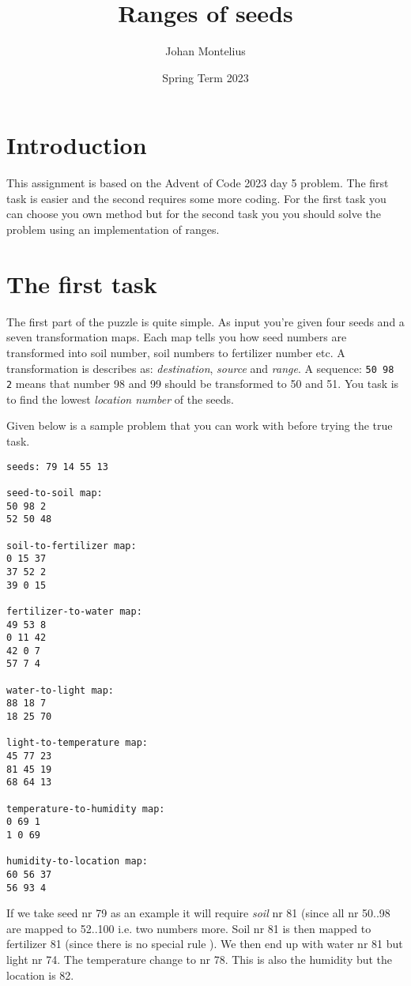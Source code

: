 \documentclass[a4paper,11pt]{article}
\begin{document}
\title{Ranges of seeds}

\author{Johan Montelius}
\date{Spring Term 2023}

\maketitle


\section*{Introduction}

This assignment is based on the Advent of Code 2023 day 5 problem. The
first task is easier and the second requires some more coding. For the
first task you can choose you own method but for the second task you
 you should solve the problem using an implementation of ranges.


\section*{The first task}

The first part of the puzzle is quite simple. As input you're given
four seeds and a seven transformation maps. Each map tells you how
seed numbers are transformed into soil number, soil numbers to
fertilizer number etc. A transformation is describes as: {\em destination},
{\em source} and {\em range}. A sequence: {\tt 50 98 2} means that number
98 and 99 should be transformed to 50 and 51. You task is to find the
lowest {\em location number} of the seeds.

Given below is a sample problem that you can
work with before trying the true task. 

\begin{verbatim}
seeds: 79 14 55 13

seed-to-soil map:
50 98 2
52 50 48

soil-to-fertilizer map:
0 15 37
37 52 2
39 0 15

fertilizer-to-water map:
49 53 8
0 11 42
42 0 7
57 7 4

water-to-light map:
88 18 7
18 25 70

light-to-temperature map:
45 77 23
81 45 19
68 64 13

temperature-to-humidity map:
0 69 1
1 0 69

humidity-to-location map:
60 56 37
56 93 4
\end{verbatim}

If we take seed nr 79 as an example it will require {\em soil} nr 81
(since all nr 50..98 are mapped to 52..100 i.e. two numbers more. Soil
nr 81 is then mapped to fertilizer 81 (since there is no special rule
). We then end up with water nr 81 but light nr 74. The temperature
change to nr 78. This is also the humidity but the location is 82.
\end{document}
